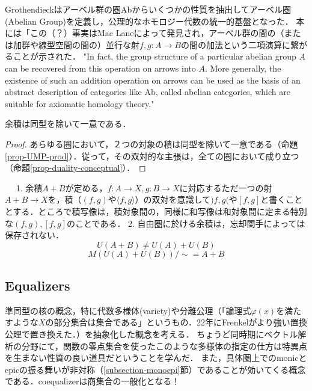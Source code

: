 \documentclass[uplatex, 12pt, dvipdfmx]{jsarticle}
\begin{document}
\begin{example}
\begin{remark*}
        Grothendieckはアーベル群の圏Abからいくつかの性質を抽出してアーベル圏(Abelian Group)を定義し，公理的なホモロジー代数の統一的基盤となった．
        本には「この（？）事実はMac Laneによって発見され，アーベル群の間の（または加群や線型空間の間の）並行な射$f,g:A\to B$の間の加法という二項演算に繋がることが示された．
        "In fact, the group structure of a particular abelian group $A$ can be recovered from this operation on arrows into $A$. More generally, the existence of such an addition operation on arrows can be used as the basis of an abstract description of categories like Ab, called abelian categories, which are suitable for axiomatic homology theory."
    \end{remark*}
\end{example}

\begin{proposition}
    余積は同型を除いて一意である．
\end{proposition}
\begin{proof}
    あらゆる圏において，２つの対象の積は同型を除いて一意である（命題\ref{prop-UMP-prod}）．従って，その双対的な主張は，全ての圏において成り立つ（命題\ref{prop-duality-conceptual}）．
\end{proof}

\begin{screen}　
    1. 余積$A+ B$が定める，$f:A\to X, g:B\to X$に対応するただ一つの射$A+B\to X$を，積（$(f,g)$や$\langle f,g\rangle$）の双対を意識して$)f,g($や$[f,g]$と書くこととする．ところで積写像は，積対象間の，同様に和写像は和対象間に定まる特別な$(f,g),[f,g]$のことである．
    2. 自由圏に於ける余積は，忘却関手によっては保存されない．
    \[ U(A+B)\ne U(A)+U(B) \]
    \[ M(U(A)+U(B))/\sim = A+B \]
\end{screen}

\subsection{Equalizers}
準同型の核の概念，特に代数多様体(variety)や分離公理（「論理式$\varphi(x)$を満たすような$X$の部分集合は集合である」というもの．22年にFrenkelがより強い置換公理で置き換えた．）を抽象化した概念を考える．
ちょうど同時期にベクトル解析の分野にて，関数の零点集合を使ったこのような多様体の指定の仕方は特異点を生まない性質の良い道具だということを学んだ．
また，具体圏上でのmonicとepicの振る舞いが非対称（\ref{subsection-monoepi}節）であることが効いてくる概念である．coequalizerは商集合の一般化となる！
\end{document}
